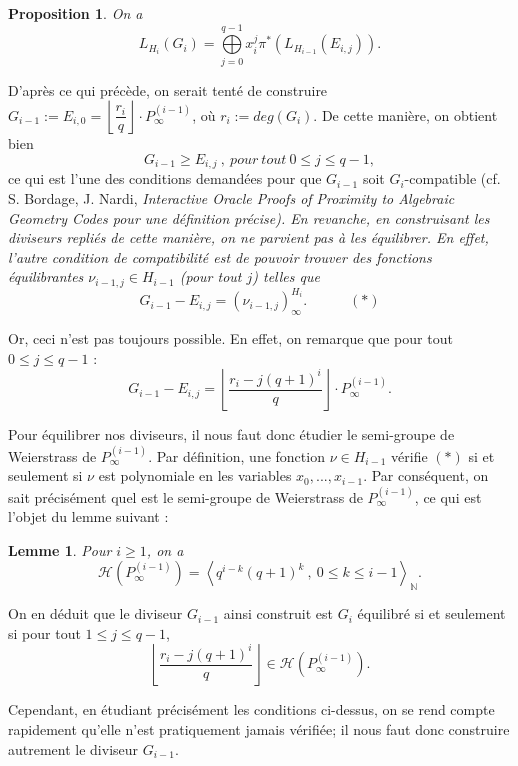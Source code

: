 \documentclass[10pt]{article}
\newtheorem{prop1}{Proposition}[]
\newtheorem{lem1}{Lemme}[]
\newcommand{\s}{\vspace{0.3cm}}
\newcommand{\cd}{\cdot}
\newcommand{\N}{\mathbb{N}}
\begin{document}
\begin{prop1} On a 
\[L_{H_i}(G_i) = \bigoplus\limits_{j=0}^{q-1} x_i^j \pi^*\left(L_{H_{i-1}}(E_{i,j})\right).\]
\end{prop1}

D'après ce qui précède, on serait tenté de construire $G_{i-1} := E_{i,0} = \left\lfloor \dfrac{r_i}{q} \right\rfloor \cd P^{(i-1)}_{\infty}$, où $r_i := deg(G_i)$. De cette manière, on obtient bien 
\[G_{i-1} \geq E_{i,j} \ , \ pour \ tout \ 0 \leq j \leq q-1,\] 
ce qui est l'une des conditions demandées pour que $G_{i-1}$ soit $G_i$-compatible (cf. S. Bordage, J. Nardi, \it{Interactive Oracle Proofs of Proximity to Algebraic
Geometry Codes} \rm pour une définition précise).
\s
En revanche, en construisant les diviseurs repliés de cette manière, on ne parvient pas à les équilibrer. En effet, l'autre condition de compatibilité est 
de pouvoir trouver des fonctions équilibrantes $\nu_{i-1,j} \in H_{i-1}$ (pour tout $j$) telles que 
\[G_{i-1}-E_{i,j} = (\nu_{i-1,j})^{H_i}_{\infty}. \quad \quad \quad (*)\]

Or, ceci n'est pas toujours possible. En effet, on remarque que pour tout $0 \leq j \leq q-1$ :
\[G_{i-1}-E_{i,j} = \left\lfloor \dfrac{r_i-j(q+1)^i}{q}\right\rfloor \cd P^{(i-1)}_{\infty}.\]

Pour équilibrer nos diviseurs, il nous faut donc étudier le semi-groupe de Weierstrass de $P^{(i-1)}_{\infty}$. Par définition, une fonction $\nu \in H_{i-1}$ vérifie $(*)$ si et seulement si $\nu$ est polynomiale en les variables $x_0,...,x_{i-1}$. Par conséquent, on sait précisément quel est le semi-groupe de Weierstrass de $P^{(i-1)}_{\infty}$, ce qui est l'objet du lemme suivant :

\begin{lem1}
Pour $i \geq 1$, on a
\[\mathcal{H}\left(P^{(i-1)}_{\infty}\right) = \left \langle q^{i-k}(q+1)^k \ , \ 0\leq k \leq i-1 \right\rangle_{\N}.\]
\end{lem1}

On en déduit que le diviseur $G_{i-1}$ ainsi construit est $G_i$ équilibré si et seulement si pour tout $1 \leq j \leq q-1$, 
\[ \left\lfloor \dfrac{r_i-j(q+1)^i}{q}\right\rfloor \in \mathcal{H}\left(P^{(i-1)}_{\infty}\right).\]

Cependant, en étudiant précisément les conditions ci-dessus, on se rend compte rapidement qu'elle n'est pratiquement jamais vérifiée; il nous faut donc construire autrement le diviseur $G_{i-1}$. 

\s
\end{document}
